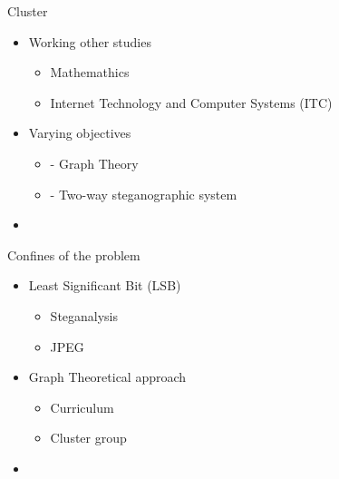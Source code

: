 
\begin{frame}{Cluster}{}
	\begin{itemize}
		\item Working other studies
        \begin{itemize}
            \item Mathemathics
            \item Internet Technology and Computer Systems (ITC)
        \end{itemize}
		\item Varying objectives
        \begin{itemize}
            \item {} - Graph Theory 
            \item {} - Two-way steganographic system
        \end{itemize}
		\item
	\end{itemize}
\end{frame}







\begin{frame}{Confines of the problem}{}
	\begin{itemize}
		\item Least Significant Bit (LSB)
        \begin{itemize}
            \item Steganalysis
            \item JPEG
        \end{itemize}
		\item Graph Theoretical approach
        \begin{itemize}
            \item Curriculum
            \item Cluster group
        \end{itemize}
		\item
	\end{itemize}
\end{frame}

